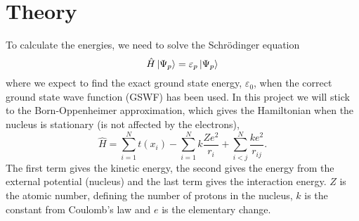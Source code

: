 \section{Theory} \label{sec:theory}
To calculate the energies, we need to solve the Schrödinger equation
\begin{equation}
\hat{H}\ket{\Psi_p}=\varepsilon_p\ket{\Psi_p}
\end{equation}
where we expect to find the exact ground state energy, $\varepsilon_0$, when the correct ground state wave function (GSWF) has been used. In this project we will stick to the Born-Oppenheimer approximation, which gives the Hamiltonian when the nucleus is stationary (is not affected by the electrons),
\begin{equation}
\hat{H}=\sum_{i=1}^Nt(x_i)-\sum_{i=1}^Nk\frac{Ze^2}{r_i}+\sum_{i<j}^N\frac{ke^2}{r_{ij}}.
\end{equation}
The first term gives the kinetic energy, the second gives the energy from the external potential (nucleus) and the last term gives the interaction energy. $Z$ is the atomic number, defining the number of protons in the nucleus, $k$ is the constant from Coulomb's law and $e$ is the elementary change.


